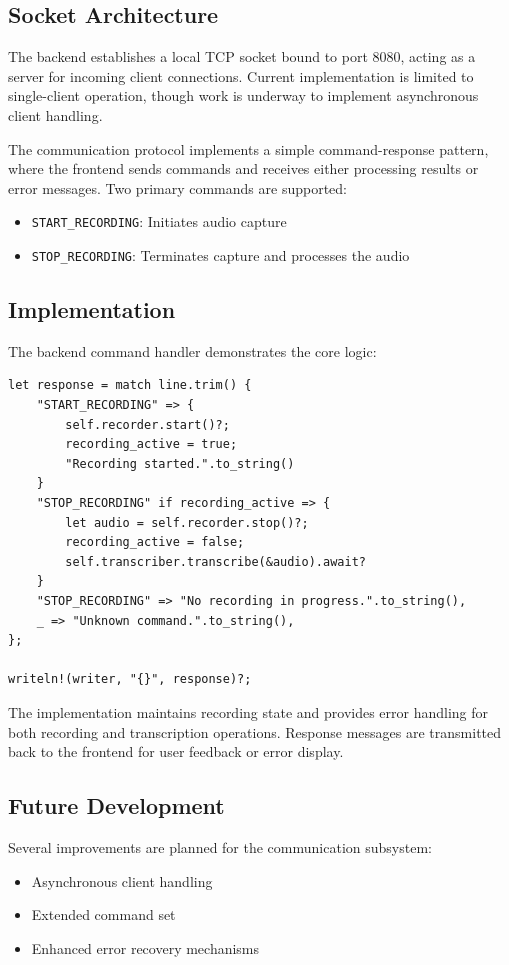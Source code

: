 \subsection{Socket Architecture}
The backend establishes a local TCP socket bound to port 8080, acting as a server for incoming client connections. Current implementation is limited to single-client operation, though work is underway to implement asynchronous client handling.

The communication protocol implements a simple command-response pattern, where the frontend sends commands and receives either processing results or error messages. Two primary commands are supported:
\begin{itemize}
    \item \texttt{START\_RECORDING}: Initiates audio capture
    \item \texttt{STOP\_RECORDING}: Terminates capture and processes the audio
\end{itemize}

\subsection{Implementation}
The backend command handler demonstrates the core logic:

\begin{verbatim}
let response = match line.trim() {
    "START_RECORDING" => {
        self.recorder.start()?;
        recording_active = true;
        "Recording started.".to_string()
    }
    "STOP_RECORDING" if recording_active => {
        let audio = self.recorder.stop()?;
        recording_active = false;
        self.transcriber.transcribe(&audio).await?
    }
    "STOP_RECORDING" => "No recording in progress.".to_string(),
    _ => "Unknown command.".to_string(),
};

writeln!(writer, "{}", response)?;
\end{verbatim}

The implementation maintains recording state and provides error handling for
both recording and transcription operations. Response messages are transmitted
back to the frontend for user feedback or error display.

\subsection{Future Development}
Several improvements are planned for the communication subsystem:
\begin{itemize}
    \item Asynchronous client handling
    \item Extended command set
    \item Enhanced error recovery mechanisms
\end{itemize}


